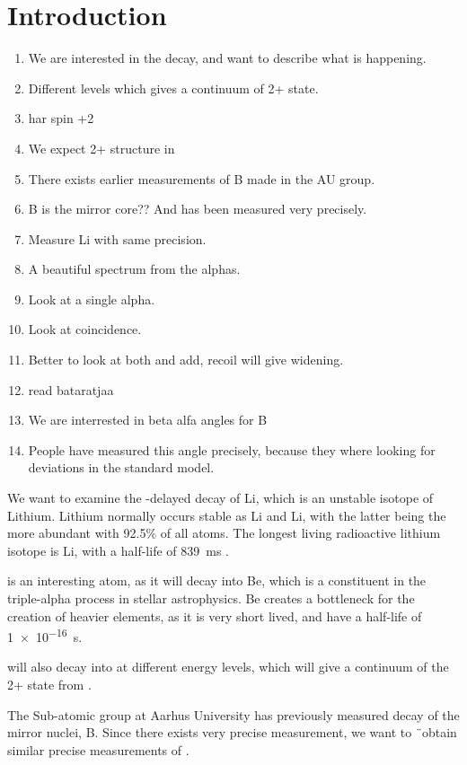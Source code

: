 \chapter{Introduction}
\begin{enumerate}
	\item We are interested in the decay, and want to describe what is happening.
	\item Different levels which gives a continuum of 2+ state.
	\item {} har spin +2
	\item We expect 2+ structure in 
	\item There exists earlier measurements of \isotope[8]B	made in the AU group.
	\item \isotope[8]B is the mirror core?? And has been measured very precisely.
	\item Measure Li with same precision.
	\item A beautiful spectrum from the alphas.
	\item Look at a single alpha.
	\item Look at coincidence.
	\item Better to look at both and add, recoil will give widening.
	\item read bataratjaa
	\item We are interrested in beta alfa angles for \isotope[12]B
	\item People have measured this angle precisely, because they where looking for deviations in the standard model.
\end{enumerate}


We want to examine the \be-delayed decay of \isotope[8]Li, which is an unstable isotope of Lithium. Lithium normally occurs stable as \isotope[6]Li and \isotope[7]Li, with the latter being the more abundant with 92.5\% of all atoms. The longest living radioactive lithium isotope is \isotope[8]Li, with a half-life of \SI{839}{ms} . 

\li is an interesting atom, as it will decay into \isotope[8]Be, which is a constituent in the triple-alpha process in stellar astrophysics. \isotope[8]Be creates a bottleneck for the creation of heavier elements, as it is very short lived, and have a half-life of \SI{1e-16}{s}.

\li will also decay into \ber at different energy levels, which will give a continuum of the 2+ state from \li. 

The Sub-atomic group at Aarhus University has previously measured decay of the mirror nuclei, \isotope[8]B. Since there exists very precise measurement, we want to ¨obtain similar precise measurements of \li. 

